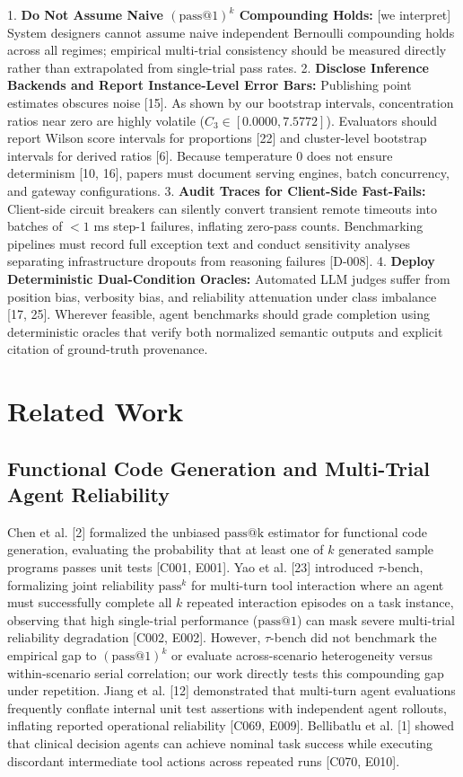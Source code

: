 \documentclass[11pt,letterpaper]{article}
\begin{document}
1. \textbf{Do Not Assume Naive $(\text{pass@1})^k$ Compounding Holds:} [we interpret] System designers cannot assume naive independent Bernoulli compounding holds across all regimes; empirical multi-trial consistency should be measured directly rather than extrapolated from single-trial pass rates.
2. \textbf{Disclose Inference Backends and Report Instance-Level Error Bars:} Publishing point estimates obscures noise [15]. As shown by our bootstrap intervals, concentration ratios near zero are highly volatile ($C_3 \in [0.0000, 7.5772]$). Evaluators should report Wilson score intervals for proportions [22] and cluster-level bootstrap intervals for derived ratios [6]. Because temperature 0 does not ensure determinism [10, 16], papers must document serving engines, batch concurrency, and gateway configurations.
3. \textbf{Audit Traces for Client-Side Fast-Fails:} Client-side circuit breakers can silently convert transient remote timeouts into batches of $<1$ ms step-1 failures, inflating zero-pass counts. Benchmarking pipelines must record full exception text and conduct sensitivity analyses separating infrastructure dropouts from reasoning failures [D-008].
4. \textbf{Deploy Deterministic Dual-Condition Oracles:} Automated LLM judges suffer from position bias, verbosity bias, and reliability attenuation under class imbalance [17, 25]. Wherever feasible, agent benchmarks should grade completion using deterministic oracles that verify both normalized semantic outputs and explicit citation of ground-truth provenance.



\section{Related Work}

\subsection{Functional Code Generation and Multi-Trial Agent Reliability}
Chen et al. [2] formalized the unbiased $\text{pass@k}$ estimator for functional code generation, evaluating the probability that at least one of $k$ generated sample programs passes unit tests [C001, E001]. Yao et al. [23] introduced $\tau$-bench, formalizing joint reliability $\text{pass}^k$ for multi-turn tool interaction where an agent must successfully complete all $k$ repeated interaction episodes on a task instance, observing that high single-trial performance ($\text{pass@1}$) can mask severe multi-trial reliability degradation [C002, E002]. However, $\tau$-bench did not benchmark the empirical gap to $(\text{pass@1})^k$ or evaluate across-scenario heterogeneity versus within-scenario serial correlation; our work directly tests this compounding gap under repetition. Jiang et al. [12] demonstrated that multi-turn agent evaluations frequently conflate internal unit test assertions with independent agent rollouts, inflating reported operational reliability [C069, E009]. Bellibatlu et al. [1] showed that clinical decision agents can achieve nominal task success while executing discordant intermediate tool actions across repeated runs [C070, E010].
\end{document}
